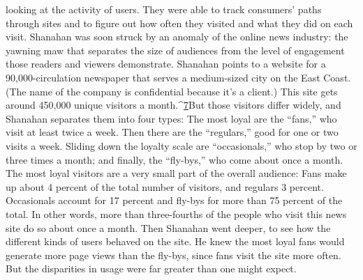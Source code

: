 looking at the activity of users. They were able to track consumers' paths through
sites and to figure out how often they visited and what they did on each visit.
Shanahan was soon struck by an anomaly of the online news industry: the yawning
maw that separates the size of audiences from the level of engagement those
readers and viewers demonstrate.
Shanahan points to a website for a 90,000-circulation newspaper that serves a
medium-sized city on the East Coast. (The name of the company is confidential
because it's a client.) This site gets around 450,000 unique visitors a month.^{\href{#endnotes-chapter-2}{7}}But those visitors differ widely, and Shanahan separates them into four types:
The most loyal are the ``fans,'' who visit at least twice a week. Then there are the
``regulars,'' good for one or two visits a week. Sliding down the loyalty scale are
``occasionals,'' who stop by two or three times a month; and finally, the ``fly-bys,''
who come about once a month.
The most loyal visitors are a very small part of the overall audience: Fans make
up about 4 percent of the total number of visitors, and regulars 3 percent. Occasionals
account for 17 percent and fly-bys for more than 75 percent of the total.
In other words, more than three-fourths of the people who visit this news site
do so about once a month.
Then Shanahan went deeper, to see how the different kinds of users behaved
on the site. He knew the most loyal fans would generate more page views than
the fly-bys, since fans visit the site more often. But the disparities in usage were
far greater than one might expect.

